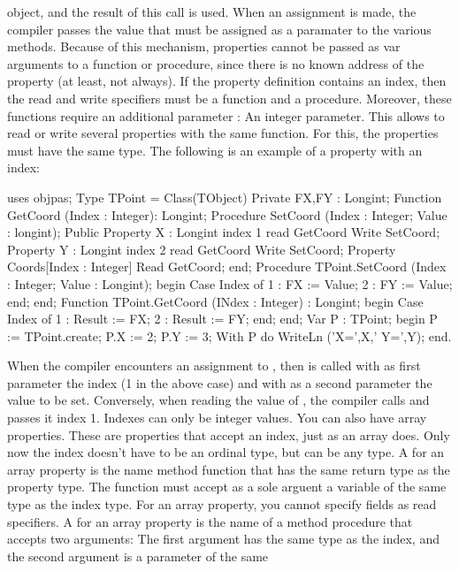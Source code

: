 \documentclass{report}
\begin{document}
object, and the result of this call is used. When an assignment is made, 
the compiler passes the value that must be assigned as a paramater to 
the various  methods.
Because of this mechanism, properties cannot be passed as var arguments to a
function or procedure, since there is no known address of the property (at
least, not always).
If the property definition contains an index, then the read and write
specifiers must be a function and a procedure. Moreover, these functions
require an additional parameter : An integer parameter. This allows to read
or write several properties with the same function. For this, the properties
must have the same type.
The following is an example of a property with an index:
\begin{listing}
uses objpas;
Type TPoint = Class(TObject)
       Private
       FX,FY : Longint;
       Function GetCoord (Index : Integer): Longint;
       Procedure SetCoord (Index : Integer; Value : longint); 
       Public
       Property X : Longint index 1 read GetCoord Write SetCoord;
       Property Y : Longint index 2 read GetCoord Write SetCoord;
       Property Coords[Index : Integer] Read GetCoord;
       end;
Procedure TPoint.SetCoord (Index : Integer; Value : Longint);
begin
  Case Index of
   1 : FX := Value;
   2 : FY := Value;
  end;
end;
Function TPoint.GetCoord (INdex : Integer) : Longint;
begin
  Case Index of
   1 : Result := FX;
   2 : Result := FY;
  end;
end;
Var P : TPoint;
begin
  P := TPoint.create;
  P.X := 2;
  P.Y := 3;
  With P do
    WriteLn ('X=',X,' Y=',Y);
end.
\end{listing}
When the compiler encounters an assignment to , then  
is called with as first parameter the index (1 in the above case) and with
as a second parameter the value to be set.
Conversely, when reading the value of , the compiler calls
 and passes it index 1. 
Indexes can only be integer values.
You can also have array properties. These are properties that accept an
index, just as an array does. Only now the index doesn't have to be an 
ordinal type, but can be any type.
A  for an array property is the name method function 
that has the same return type as  the property type. 
The function must accept as a sole arguent a variable of the same type as 
the index type. For an array property, you cannot specify fields as read 
specifiers. 
A  for an array property is the name of a method 
procedure that accepts two arguments: The first argument has the same 
type as the index, and the second argument is a parameter of the same 
\end{document}
